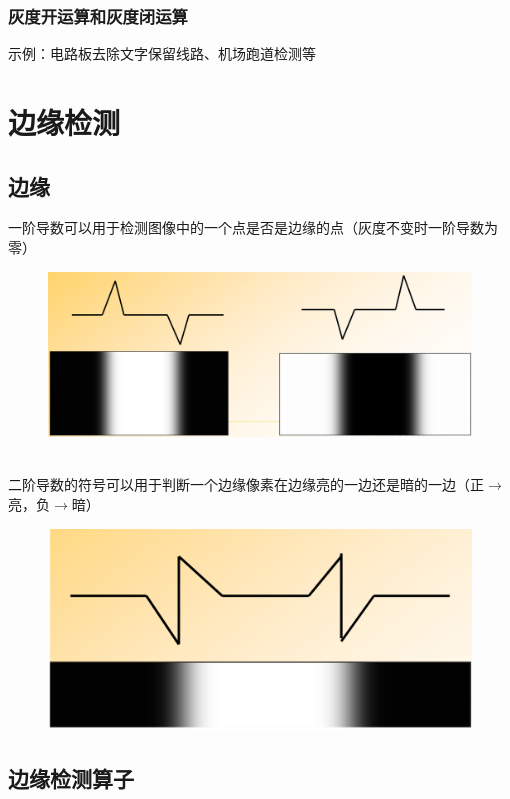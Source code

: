 \documentclass[11pt]{article}
\begin{document}
\subsubsection{灰度开运算和灰度闭运算}
示例：电路板去除文字保留线路、机场跑道检测等


\section{边缘检测}

\subsection{边缘}
一阶导数可以用于检测图像中的一个点是否是边缘的点（灰度不变时一阶导数为零）
\begin{figure}[htb]
    \centering
    \includegraphics[scale=0.1]{imgs/edge_1.png}
\end{figure}
\\
二阶导数的符号可以用于判断一个边缘像素在边缘亮的一边还是暗的一边（正$\to$亮，负$\to$暗）
\begin{figure}[htb]
    \centering
    \includegraphics[scale=0.1]{imgs/edge_2.png}
\end{figure}

\subsection{边缘检测算子}
\end{document}
